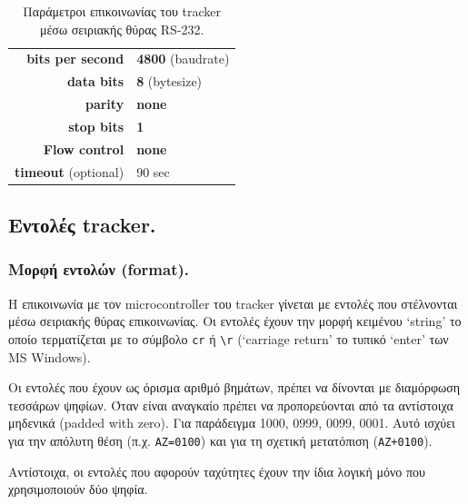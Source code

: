 \documentclass[
  a4paper,
  twoside,
  titlepage,
  11pt]{article}
\numberwithin{equation}{section}
\numberwithin{figure}{section}
\numberwithin{table}{section}
\begin{document}
\footnotesize

\begin{longtable}[]{@{}rl@{}}
\caption{\label{tab:trackerserial} Παράμετροι επικοινωνίας του tracker μέσω σειριακής θύρας RS-232.}\tabularnewline
\toprule
\endhead
\textbf{bits per second} & \textbf{4800} (baudrate) \\
\textbf{data bits} & \textbf{8} (bytesize) \\
\textbf{parity} & \textbf{none} \\
\textbf{stop bits} & \textbf{1} \\
\textbf{Flow control} & \textbf{none} \\
\textbf{timeout} (optional) & 90 sec \\
\bottomrule
\end{longtable}

\normalsize

\hypertarget{ux3b5ux3bdux3c4ux3bfux3bbux3adux3c2-tracker.}{%
\subsection{Εντολές tracker.}\label{ux3b5ux3bdux3c4ux3bfux3bbux3adux3c2-tracker.}}

\hypertarget{ux3bcux3bfux3c1ux3c6ux3ae-ux3b5ux3bdux3c4ux3bfux3bbux3ceux3bd-format.}{%
\subsubsection{Μορφή εντολών (format).}\label{ux3bcux3bfux3c1ux3c6ux3ae-ux3b5ux3bdux3c4ux3bfux3bbux3ceux3bd-format.}}

Η επικοινωνία με τον microcontroller του tracker γίνεται με εντολές που στέλνονται
μέσω σειριακής θύρας επικοινωνίας. Οι εντολές έχουν την μορφή κειμένου `string' το
οποίο τερματίζεται με το σύμβολο \texttt{\textquotesingle{}cr\textquotesingle{}} ή \texttt{\textquotesingle{}\textbackslash{}r\textquotesingle{}} (`carriage return' το τυπικό `enter'
των MS Windows).

Οι εντολές που έχουν ως όρισμα αριθμό βημάτων, πρέπει να δίνονται με διαμόρφωση
τεσσάρων ψηφίων. Όταν είναι αναγκαίο πρέπει να προπορεύονται από τα αντίστοιχα
μηδενικά (padded with zero). Για παράδειγμα 1000, 0999, 0099, 0001. Αυτό ισχύει για
την απόλυτη θέση (π.χ. \texttt{\textquotesingle{}AZ=0100\textquotesingle{}}) και για τη σχετική μετατόπιση (\texttt{\textquotesingle{}AZ+0100\textquotesingle{}}).

Αντίστοιχα, οι εντολές που αφορούν ταχύτητες έχουν την ίδια λογική μόνο που
χρησιμοποιούν δύο ψηφία.
\end{document}
